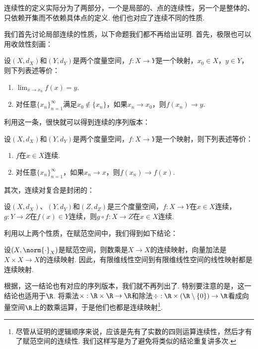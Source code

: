 连续性的定义实际分为了两部分，一个是局部的、点的连续性，另一个是整体的、只依赖开集而不依赖具体点的定义. 他们也对应了连续不同的性质. 

我们首先讨论局部连续的性质，以下命题我们都不再给出证明. 首先，极限也可以用收敛性刻画：

\begin{theorem}\label{thm:limit-converge}
    设$(X,d_X)$和$(Y,d_Y)$是两个度量空间，$f:X\to Y$是一个映射，$x_0\in X$，$y\in Y$，则下列表述等价：
    \begin{enumerate}
        \item $\lim_{x\to x_0}f(x)=y$. 
        \item 对任意$\{x_n\}_{n=1}^\infty$满足$x_0\notin\{x_n\}$，如果$x_n\to x_0$，则$f(x_n)\to y$.
    \end{enumerate}
\end{theorem}

利用这一条，很快就可以得到连续的序列版本：

\begin{corollary}\label{cor:continuous-converge}
    设$(X,d_X)$和$(Y,d_Y)$是两个度量空间，$f:X\to Y$是一个映射，则下列表述等价：
    \begin{enumerate}
        \item $f$在$x\in X$连续. 
        \item 对任意$\{x_n\}_{n=1}^\infty$，如果$x_n\to x$，则$f(x_n)\to f(x)$.
    \end{enumerate}
\end{corollary}

其次，连续对复合是封闭的：
\begin{proposition}\label{prop:continuous-composition}
    设$(X,d_X)$、$(Y,d_Y)$和$(Z,d_Z)$是三个度量空间，$f:X\to Y$在$x\in X$连续，$g:Y\to Z$在$f(x)\in Y$连续，则$g\circ f:X\to Z$在$x\in X$连续. 
\end{proposition}

利用以上两个性质，在赋范空间中，我们得到如下结论：
\begin{corollary}\label{cor:continuous-linear}
    设$(X,\norm{\cdot}_X)$是赋范空间，则数乘是$X\to X$的连续映射，向量加法是$X\times X\to X$的连续映射. 因此，有限维线性空间到有限维线性空间的线性映射都是连续映射. 
\end{corollary}

根据，这一结论也有对应的序列版本，我们就不再列出了. 特别要注意的是，这一结论也适用于$\R$. 将乘法$\times:\R\times\R\to\R$和除法$\div:\R\times(\R\setminus\{0\})\to\R$看成向量空间$\R$上的数乘运算，于是他们也都是连续映射\footnote{尽管从证明的逻辑顺序来说，应该是先有了实数的四则运算连续性，然后才有了赋范空间的连续性. 我们这样写是为了避免将类似的结论重复讲多次.  }. 

